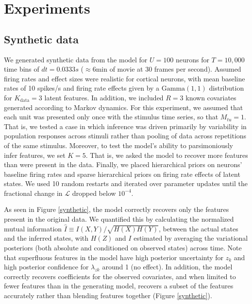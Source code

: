 \documentclass[12pt,a4paper]{article}
\begin{document}
\section*{Experiments}
\subsection*{Synthetic data}
We generated synthetic data from the model for $U=100$ neurons for $T=10,000$ time bins of $dt=0.0333s$ ($\approx 6$min of movie at 30 frames per second). Assumed firing rates and effect sizes were realistic for cortical neurons, with mean baseline rates of 10 spikes/s and firing rate effects given by a $\text{Gamma}(1, 1)$ distribution for $K_{\text{data}}=3$ latent features. In addition, we included $R=3$ known covariates generated according to Markov dynamics. For this experiment, we assumed that each unit was presented only once with the stimulus time series, so that $M_{tu} = 1$. That is, we tested a case in which inference was driven primarily by variability in population responses across stimuli rather than pooling of data across repetitions of the same stimulus. Moreover, to test the model's ability to parsimoniously infer features, we set $K=5$. That is, we asked the model to recover more features than were present in the data. Finally, we placed hierarchical priors on neurons' baseline firing rates and sparse hierarchical priors on firing rate effects of latent states. We used 10 random restarts and iterated over parameter updates until the fractional change in $\mathcal{L}$ dropped below $10^{-4}$.

As seen in Figure \ref{synthetic}, the model correctly recovers only the features present in the original data. We quantified this by calculating the normalized mutual information $\hat{I}\equiv I(X, Y)/\sqrt{H(X)H(Y)}$, between the actual states and the inferred states, with $H(Z)$ and $I$ estimated by averaging the variational posteriors (both absolute and conditioned on observed states) across time. Note that superfluous features in the model have high posterior uncertainty for $z_k$ and high posterior confidence for $\lambda_{zk}$ around 1 (no effect). In addition, the model correctly recovers coefficients for the observed covariates, and when limited to fewer features than in the generating model, recovers a subset of the features accurately rather than blending features together (Figure \ref{synthetic}).
\end{document}
